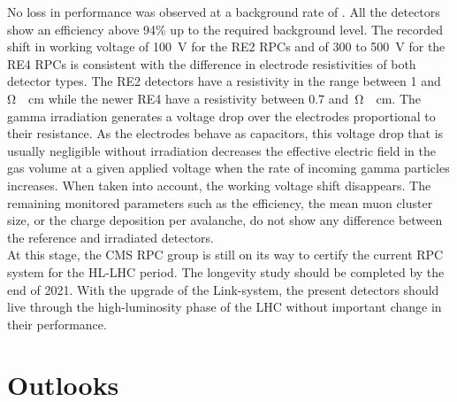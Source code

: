 	No loss in performance was observed at a background rate of . All the detectors show an efficiency above 94\% up to the required background level. The recorded shift in working voltage of \SI{100}{V} for the RE2 RPCs and of 300 to \SI{500}{V} for the RE4 RPCs is consistent with the difference in electrode resistivities of both detector types. The RE2 detectors have a resistivity in the range between 1 and \,\si{\ohm\cdot cm} while the newer RE4 have a resistivity between 0.7 and \,\si{\ohm\cdot cm}. The gamma irradiation generates a voltage drop over the electrodes proportional to their resistance. As the electrodes behave as capacitors, this voltage drop that is usually negligible without irradiation decreases the effective electric field in the gas volume at a given applied voltage when the rate of incoming gamma particles increases. When taken into account, the working voltage shift disappears. The remaining monitored parameters such as the efficiency, the mean muon cluster size, or the charge deposition per avalanche, do not show any difference between the reference and irradiated detectors.\\
	At this stage, the CMS RPC group is still on its way to certify the current RPC system for the HL-LHC period. The longevity study should be completed by the end of 2021. With the upgrade of the Link-system, the present detectors should live through the high-luminosity phase of the LHC without important change in their performance.

	\section{Outlooks}
	\label{chapt7:sec:outlook}
	

